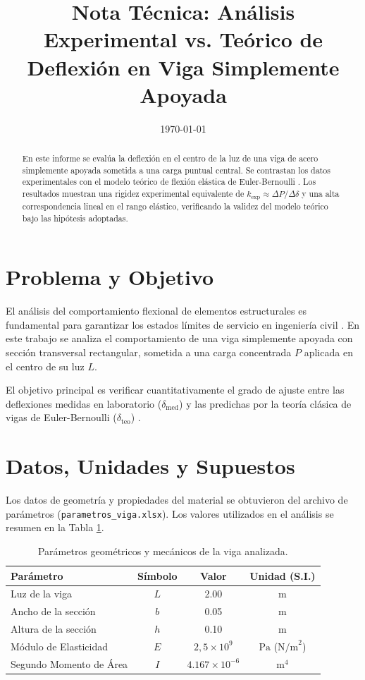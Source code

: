 \documentclass[11pt, a4paper]{article}
\title{\textbf{Nota Técnica: Análisis Experimental vs. Teórico de Deflexión en Viga Simplemente Apoyada}}
\date{\today}
\begin{document}
\maketitle

\begin{abstract}
\noindent En este informe se evalúa la deflexión en el centro de la luz de una viga de acero simplemente apoyada sometida a una carga puntual central. Se contrastan los datos experimentales con el modelo teórico de flexión elástica de Euler-Bernoulli \cite{hibbeler2017}. Los resultados muestran una rigidez experimental equivalente de $k_{\text{exp}} \approx \Delta P / \Delta \delta$ y una alta correspondencia lineal en el rango elástico, verificando la validez del modelo teórico bajo las hipótesis adoptadas.
\end{abstract}

\section{Problema y Objetivo}
El análisis del comportamiento flexional de elementos estructurales es fundamental para garantizar los estados límites de servicio en ingeniería civil \cite{hibbeler2017}. En este trabajo se analiza el comportamiento de una viga simplemente apoyada con sección transversal rectangular, sometida a una carga concentrada $P$ aplicada en el centro de su luz $L$. 

El objetivo principal es verificar cuantitativamente el grado de ajuste entre las deflexiones medidas en laboratorio ($\delta_{\text{med}}$) y las predichas por la teoría clásica de vigas de Euler-Bernoulli ($\delta_{\text{teo}}$) \cite{hibbeler2017}.

\section{Datos, Unidades y Supuestos}
Los datos de geometría y propiedades del material se obtuvieron del archivo de parámetros (\texttt{parametros\_viga.xlsx}). Los valores utilizados en el análisis se resumen en la Tabla \ref{tab:parametros}.

\begin{table}[h!]
\centering
\caption{Parámetros geométricos y mecánicos de la viga analizada.}
\label{tab:parametros}
\begin{tabular}{lccc}
\toprule
\textbf{Parámetro} & \textbf{Símbolo} & \textbf{Valor} & \textbf{Unidad (S.I.)} \\
\midrule
Luz de la viga & $L$ & 2.00 & $\text{m}$ \\
Ancho de la sección & $b$ & 0.05 & $\text{m}$ \\
Altura de la sección & $h$ & 0.10 & $\text{m}$ \\
Módulo de Elasticidad & $E$ & $2,5 \times 10^9$ & $\text{Pa}$ ($\text{N/m}^2$) \\
Segundo Momento de Área & $I$ & $4.167 \times 10^{-6}$ & $\text{m}^4$ \\
\bottomrule
\end{tabular}
\end{table}
\end{document}
